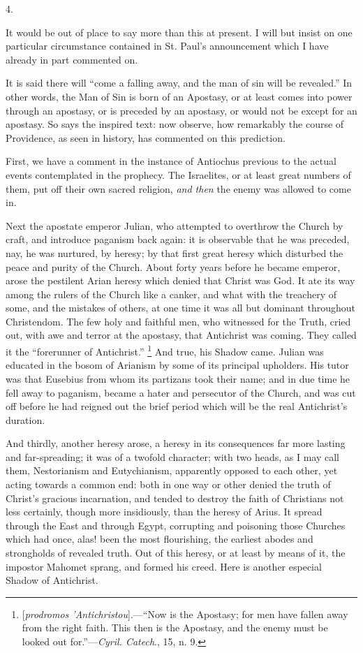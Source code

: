 4.

It would be out of place to say more than this at present. I will
but insist on one particular circumstance contained in St. Paul's
announcement which I have already in part commented on.

It is said there will ``come a falling away, and the man of sin
will be revealed.'' In other words, the Man of Sin is born of an
Apostasy, or at least comes into power through an apostasy, or is
preceded by an apostasy, or would not be except for an apostasy. So
says the inspired text: now observe, how remarkably the course of
Providence, as seen in history, has commented on this prediction.

First, we have a comment in the instance of Antiochus previous to
the actual events contemplated in the prophecy. The Israelites, or at
least great numbers of them, put off their own sacred religion, \emph{and
then} the enemy was allowed to come in.

Next the apostate emperor Julian, who attempted to overthrow the
Church by craft, and introduce paganism back again: it is observable
that he was preceded, nay, he was nurtured, by heresy; by that first
great heresy which disturbed the peace and purity of the Church. About forty years before he became emperor, arose the pestilent Arian
heresy which denied that Christ was God. It ate its way among the
rulers of the Church like a canker, and what with the treachery of
some, and the mistakes of others, at one time it was all but dominant
throughout Christendom. The few holy and faithful men, who witnessed
for the Truth, cried out, with awe and terror at the apostasy, that
Antichrist was coming. They called it the ``forerunner of
Antichrist.'' \footnote{[\emph{prodromos 'Antichristou}].—``Now
is the Apostasy; for men have fallen away from the right faith. This
then is the Apostasy, and the enemy must be looked out for.''—\emph{Cyril.
Catech}., 15, n. 9.} And
true, his Shadow came. Julian was educated in the bosom of Arianism by
some of its principal upholders. His tutor was that Eusebius from whom
its partizans took their name; and in due time he fell away to
paganism, became a hater and persecutor of the Church, and was cut off
before he had reigned out the brief period which will be the real
Antichrist's duration.

And thirdly, another heresy arose, a heresy in its consequences far
more lasting and far-spreading; it was of a twofold character; with
two heads, as I may call them, Nestorianism and Eutychianism,
apparently opposed to each other, yet acting towards a common end:
both in one way or other denied the truth of Christ's gracious
incarnation, and tended to destroy the faith of Christians not less
certainly, though more insidiously, than the heresy of Arius. It
spread through the East and through Egypt, corrupting and poisoning
those Churches which had once, alas! been the most flourishing, the
earliest abodes and strongholds of revealed truth. Out of this heresy,
or at least by means of it, the impostor Mahomet sprang, and formed
his creed. Here is another especial Shadow of Antichrist.

